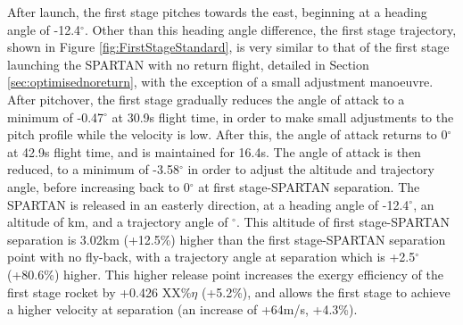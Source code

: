  After launch, the first stage pitches towards the east, beginning at a heading angle of -12.4$^\circ$.
 Other than this heading angle difference, the first stage trajectory, shown in Figure \ref{fig:FirstStageStandard}, is very similar to that of the first stage launching the SPARTAN with no return flight, detailed in Section \ref{sec:optimisednoreturn}, with the exception of a small adjustment manoeuvre. 
 After pitchover, the first stage gradually reduces the angle of attack to a minimum of -0.47$^\circ$ at 30.9s flight time, in order to make small adjustments to the pitch profile while the velocity is low. After this, the angle of attack returns to 0$^\circ$ at 42.9s flight time, and is maintained for 16.4s.
 The angle of attack is then reduced, to a minimum of -3.58$^\circ$ in order to adjust the altitude and trajectory angle, before increasing back to 0$^\circ$ at first stage-SPARTAN separation. 
 The SPARTAN is released in an easterly direction, at a heading angle of -12.4$^\circ$, an altitude of \firstsecondSeparationAltStandard km, and a trajectory angle of \firstsecondSeparationgammaStandard $^\circ$. 
 This altitude of first stage-SPARTAN separation is 3.02km (+12.5\%) higher than the first stage-SPARTAN separation point with no fly-back, with a trajectory angle at separation which is +2.5$^\circ$ (+80.6\%) higher. 
 This higher release point increases the exergy efficiency of the first stage rocket by +0.426 XX\%$\eta$ (+5.2\%), and allows the first stage to achieve a higher velocity at separation (an increase of +64m/s, +4.3\%). 
 
